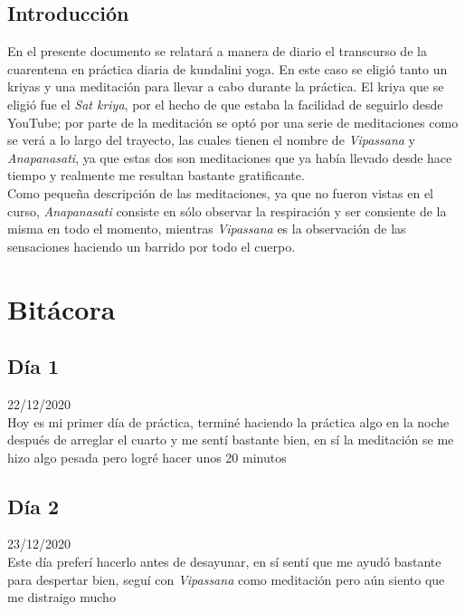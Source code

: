 \documentclass[11pt]{report}
\theoremstyle{plain}
\theoremstyle{definition}
\begin{document}

\tableofcontents


\section{Introducción}

En el presente documento se relatará a manera de diario el transcurso de la cuarentena en práctica diaria de kundalini yoga. En este caso se eligió tanto un kriyas y una meditación para llevar a cabo durante la práctica. El kriya que se eligió fue el \textit{Sat kriya}, por el hecho de que estaba la facilidad de seguirlo desde YouTube; por parte de la meditación se optó por una serie de meditaciones como se verá a lo largo del trayecto, las cuales tienen el nombre de \textit{Vipassana} y \textit{Anapanasati}, ya que estas dos son meditaciones que ya había llevado desde hace tiempo y realmente me resultan bastante gratificante.\\
Como pequeña descripción de las meditaciones, ya que no fueron vistas en el curso, \textit{Anapanasati} consiste en sólo observar la respiración y ser consiente de la misma en todo el momento, mientras \textit{Vipassana} es la observación de las sensaciones haciendo un barrido por todo el cuerpo.


\chapter{Bitácora}

\section*{Día 1}
	22/12/2020\\
	Hoy es mi primer día de práctica, terminé haciendo la práctica algo en la noche después de arreglar el cuarto y me sentí bastante bien, en sí la meditación se me hizo algo pesada pero logré hacer unos 20 minutos
	
\section*{Día 2}
	23/12/2020\\
	Este día preferí hacerlo antes de desayunar, en sí sentí que me ayudó bastante para despertar bien, seguí con \textit{Vipassana} como meditación pero aún siento que me distraigo mucho
\end{document}

